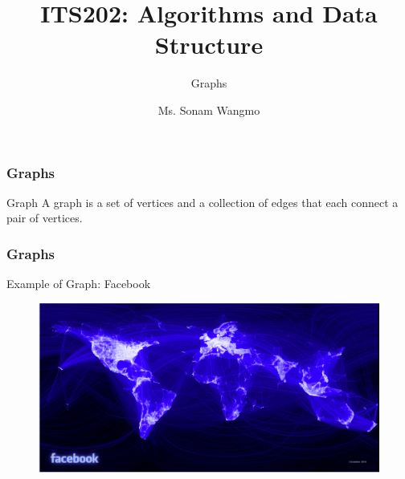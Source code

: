 \documentclass[11pt]{beamer}
\begin{document}
	\author{Ms. Sonam Wangmo}
	\title{ITS202: Algorithms and Data Structure}
	\subtitle{Graphs}
	\institute{
		\textcolor{blue}{Gyalpozhing College of Information Technology \\ Royal University of Bhutan} \\
		\vspace{0.5cm}
	}
	\begin{frame}[plain]
		\maketitle
	\end{frame}

  \begin{frame}
 	\frametitle	{Graphs} 
 	\begin{block}{Graph}
 		A graph is a set of vertices and a collection of edges that each connect a pair of vertices.
 	\end{block} 
    
 \end{frame}

  \begin{frame}
	\frametitle	{Graphs} 
	\alert{Example of Graph: Facebook}
	\begin{figure}
		\centering
		\includegraphics[width=1.05\linewidth]{"Screenshot 2020-11-30 at 8.56.36 PM"}
		\label{fig:screenshot-2020-11-30-at-8}
	\end{figure}	
\end{frame}
\end{document}
